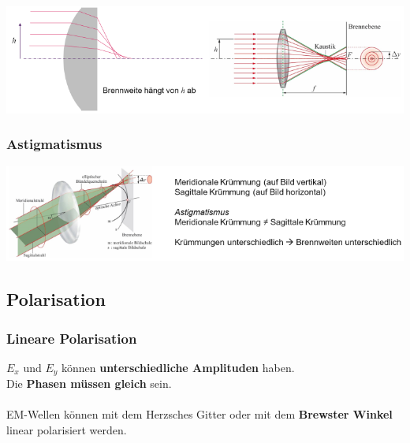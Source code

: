 \includegraphics[width=0.9\linewidth]{Bilder/Wellen-Optik/Aberration}



\subsubsection{Astigmatismus}

\includegraphics[width=0.9\linewidth]{Bilder/Wellen-Optik/Astigmatismus}





\subsection{Polarisation}


\subsubsection{Lineare Polarisation}

$E_x$ und $E_y$ können \textbf{unterschiedliche Amplituden} haben. \\
Die \textbf{Phasen müssen gleich} sein.\\
\\
EM-Wellen können mit dem Herzsches Gitter oder mit dem \textbf{Brewster Winkel} linear polarisiert werden.

